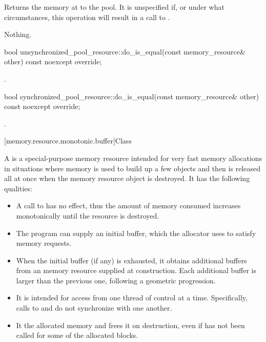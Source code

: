 \begin{itemdescr}
\pnum
\effects
Returns the memory at  to the pool.
It is unspecified if, or under what circumstances,
this operation will result in a call to .

\pnum
\throws
Nothing.
\end{itemdescr}

%
\begin{itemdecl}
bool unsynchronized_pool_resource::do_is_equal(const memory_resource& other) const noexcept override;
\end{itemdecl}

\begin{itemdescr}
\pnum
\returns
{}.
\end{itemdescr}

%
\begin{itemdecl}
bool synchronized_pool_resource::do_is_equal(const memory_resource& other) const noexcept override;
\end{itemdecl}

\begin{itemdescr}
\pnum
\returns
{}.
\end{itemdescr}

[memory.resource.monotonic.buffer]{Class }

\pnum
A  is a special-purpose memory resource
intended for very fast memory allocations in situations
where memory is used to build up a few objects
and then is released all at once when the memory resource object is destroyed.
It has the following qualities:
\begin{itemize}
\item
A call to  has no effect,
thus the amount of memory consumed increases monotonically
until the resource is destroyed.
\item
The program can supply an initial buffer,
which the allocator uses to satisfy memory requests.
\item
When the initial buffer (if any) is exhausted,
it obtains additional buffers from an  memory resource
supplied at construction.
Each additional buffer is larger than the previous one,
following a geometric progression.
\item
It is intended for access from one thread of control at a time.
Specifically, calls to  and 
do not synchronize with one another.
\item
It  the allocated memory and frees it on destruction,
even if  has not been called for some of the allocated blocks.
\end{itemize}

